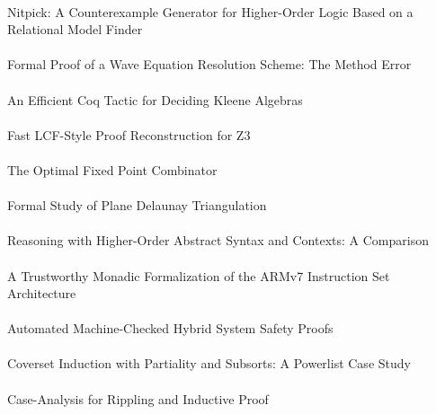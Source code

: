 \documentclass{article}
\begin{document}
\cite{10-blanchette-nitpick} \\
{Nitpick:} A Counterexample Generator for Higher-Order Logic Based on a Relational Model Finder \\

\cite{10-boldo-wave} \\
Formal Proof of a Wave Equation Resolution Scheme: The Method Error \\

\cite{10-braibant-kleene} \\
An Efficient {Coq} Tactic for Deciding {Kleene} Algebras \\

\cite{10-boehme-z3} \\
Fast {LCF}-Style Proof Reconstruction for {Z3} \\

\cite{10-chargueraud-combinator} \\
The Optimal Fixed Point Combinator \\

\cite{10-dufourd-triangulation} \\
Formal Study of Plane {Delaunay} Triangulation \\

\cite{10-felty-hoas} \\
Reasoning with Higher-Order Abstract Syntax and Contexts: A Comparison \\

\cite{10-fox-armv7} \\
A Trustworthy Monadic Formalization of the {ARMv7} Instruction Set Architecture \\

\cite{10-geuvers-safety} \\
Automated Machine-Checked Hybrid System Safety Proofs \\

\cite{10-hendrix-coverset} \\
Coverset Induction with Partiality and Subsorts: A Powerlist Case Study \\

\cite{10-johansson-rippling} \\
Case-Analysis for Rippling and Inductive Proof \\
\end{document}
